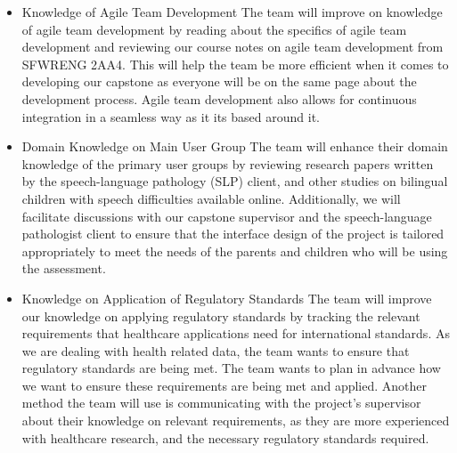 \documentclass[12pt]{article}
\begin{document}
\begin{enumerate}
\begin{itemize}
    \item Knowledge of Agile Team Development
    \subitem The team will improve on knowledge of agile team development by reading about the specifics of agile team development and reviewing our course notes on agile team development from SFWRENG 2AA4. This will help the team be more efficient when it comes to developing our capstone as everyone will be on the same page about the development process. Agile team development also allows for continuous integration in a seamless way as it its based around it. 

    \item Domain Knowledge on Main User Group
    \subitem The team will enhance their domain knowledge of the primary user groups by reviewing research papers written by the speech-language pathology (SLP) client, and other studies on bilingual children with speech difficulties available online. Additionally, we will facilitate discussions with our capstone supervisor and the speech-language pathologist client to ensure that the interface design of the project is tailored appropriately to meet the needs of the parents and children who will be using the assessment.
    
    \item Knowledge on Application of Regulatory Standards
    \subitem The team will improve our knowledge on applying regulatory standards by tracking the relevant requirements that healthcare applications need for international standards. As we are dealing with health related data, the team wants to ensure that regulatory standards are being met. The team wants to plan in advance how we want to ensure these requirements are being met and applied. Another method the team will use is communicating with the project's supervisor about their knowledge on relevant requirements, as they are more experienced with healthcare research, and the necessary regulatory standards required.
  \end{itemize}

\end{enumerate}

\newpage
\end{document}
